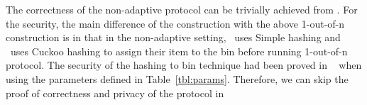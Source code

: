 The correctness of the non-adaptive \OPPRF protocol can be trivially achieved from . For the security, the main difference of the construction with the above 1-out-of-n \OPPRF construction is in that in the non-adaptive setting, \SS\ uses Simple hashing and \RR\ uses Cuckoo hashing to assign their item to the bin before running 1-out-of-n \OPPRF protocol. The security of the hashing to bin technique had been proved in ~\cite{eprint:PSZ16} when using the parameters defined in Table~\ref{tbl:params}. Therefore, we can skip the proof of correctness and privacy of the protocol in 


%
